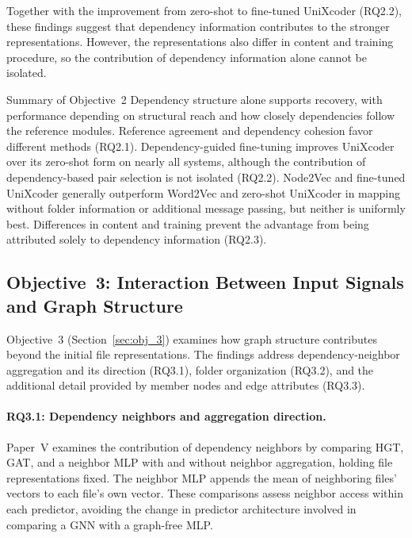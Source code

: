 Together with the improvement from zero-shot to fine-tuned UniXcoder (RQ2.2), these findings suggest that dependency information contributes to the stronger representations. However, the representations also differ in content and training procedure, so the contribution of dependency information alone cannot be isolated.

\begin{GrayBox}{Summary of Objective~2}
Dependency structure alone supports recovery, with performance depending on structural reach and how closely dependencies follow the reference modules. Reference agreement and dependency cohesion favor different methods (RQ2.1). Dependency-guided fine-tuning improves UniXcoder over its zero-shot form on nearly all systems, although the contribution of dependency-based pair selection is not isolated (RQ2.2). Node2Vec and fine-tuned UniXcoder generally outperform Word2Vec and zero-shot UniXcoder in mapping without folder information or additional message passing, but neither is uniformly best. Differences in content and training prevent the advantage from being attributed solely to dependency information (RQ2.3).
\end{GrayBox}

\subsection{Objective~3: Interaction Between Input Signals and Graph Structure \label{sec:cont_3}}

Objective~3 (Section~\ref{sec:obj_3}) examines how graph structure contributes beyond the initial file representations. The findings address dependency-neighbor aggregation and its direction (RQ3.1), folder organization (RQ3.2), and the additional detail provided by member nodes and edge attributes (RQ3.3).

\paragraph{RQ3.1: Dependency neighbors and aggregation direction.} Paper~V examines the contribution of dependency neighbors by comparing HGT, GAT, and a neighbor MLP with and without neighbor aggregation, holding file representations fixed. The neighbor MLP appends the mean of neighboring files' vectors to each file's own vector. These comparisons assess neighbor access within each predictor, avoiding the change in predictor architecture involved in comparing a GNN with a graph-free MLP.

